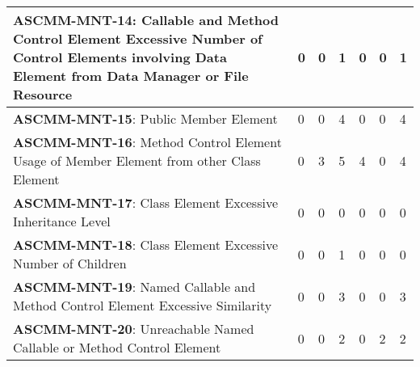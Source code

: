 \documentclass[openany,10pt,a4paper]{article}
\begin{document}
\begin{longtable}{p{3.2in}|p{0.28in}|p{0.28in}|p{0.28in}|p{0.28in}|p{0.28in}|p{0.35in}}
\textbf{ASCMM-MNT-14}: Callable and Method Control Element Excessive Number of Control Elements involving Data Element from Data Manager or File Resource & 0 & 0 & 1 & 0 & 0 & 1 \\ \hline
\textbf{ASCMM-MNT-15}: Public Member Element & 0 & 0 & 4 & 0 & 0 & 4 \\ \hline
\textbf{ASCMM-MNT-16}: Method Control Element Usage of Member Element from other Class Element & 0 & 3 & 5 & 4 & 0 & 4 \\ \hline
\textbf{ASCMM-MNT-17}: Class Element Excessive Inheritance Level & 0 & 0 & 0 & 0 & 0 & 0 \\ \hline
\textbf{ASCMM-MNT-18}: Class Element Excessive Number of Children & 0 & 0 & 1 & 0 & 0 & 0 \\ \hline
\textbf{ASCMM-MNT-19}: Named Callable and Method Control Element Excessive Similarity & 0 & 0 & 3 & 0 & 0 & 3 \\ \hline
\textbf{ASCMM-MNT-20}: Unreachable Named Callable or Method Control Element & 0 & 0 & 2 & 0 & 2 & 2 \\ \hline
	\end{longtable} 
\end{document}
